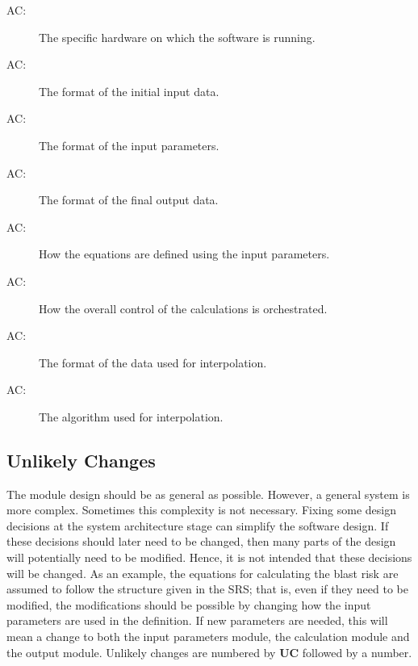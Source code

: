 \documentclass[12pt]{article}
\newcounter{acnum}
\newcommand{\actheacnum}{AC\theacnum}
\begin{document}
\begin{description}
\item[ \actheacnum \label{acHardware}:] The specific
  hardware on which the software is running.
\item[ \actheacnum \label{acInput}:] The format of the
  initial input data.
\item[ \actheacnum \label{acParams}:] The format of the
  input parameters.
\item[ \actheacnum \label{acOutput}:] The format of the
  final output data.
\item[ \actheacnum \label{acCalc}:] How the equations are 
defined using the input parameters.
\item[ \actheacnum \label{acControl}:] How the overall
  control of the calculations is orchestrated.
\item[ \actheacnum \label{acIntData}:] The format of the 
data used for interpolation.
\item[ \actheacnum \label{acInt}:] The algorithm used
  for interpolation.

\end{description}

\subsection{Unlikely Changes} \label{SecUchange}

The module design should be as general as possible. However, a general system is
more complex. Sometimes this complexity is not necessary. Fixing some design
decisions at the system architecture stage can simplify the software design. If
these decisions should later need to be changed, then many parts of the design
will potentially need to be modified. Hence, it is not intended that these
decisions will be changed.  As an example, the equations for calculating the 
blast risk  are assumed to follow the structure given in the SRS; that is,
even if they need to be modified, the modifications should be possible by
changing how the input parameters are used in the definition.  If new parameters
are needed, this will mean a change to both the input parameters module, the
calculation module and the output module.
 Unlikely changes are numbered by \textbf{UC}
followed by a number.
\end{document}
